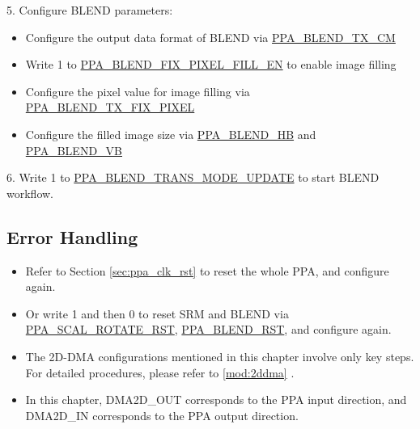 \documentclass[main\_\_EN.tex]{subfiles}
\begin{document}
5. Configure BLEND parameters:
\begin{itemize}
    \item Configure the output data format of BLEND via \hyperref[fielddesc:PPABLENDTXCM]{PPA\_BLEND\_TX\_CM}
    \item Write 1 to \hyperref[fielddesc:PPABLENDFIXPIXELFILLEN]{PPA\_BLEND\_FIX\_PIXEL\_FILL\_EN} to enable image filling
    \item Configure the pixel value for image filling via \hyperref[fielddesc:PPABLENDTXFIXPIXEL]{PPA\_BLEND\_TX\_FIX\_PIXEL}
    \item Configure the filled image size via \hyperref[fielddesc:PPABLENDHB]{PPA\_BLEND\_HB} and \hyperref[fielddesc:PPABLENDVB]{PPA\_BLEND\_VB}
\end{itemize}

6. Write 1 to \hyperref[fielddesc:PPABLENDTRANSMODEUPDATE]{PPA\_BLEND\_TRANS\_MODE\_UPDATE} to start BLEND workflow.

\subsection{Error Handling}
\begin{itemize}
    \item Refer to Section \ref{sec:ppa_clk_rst} to reset the whole PPA, and configure again.
    \item Or write 1 and then 0 to reset SRM and BLEND via \hyperref[fielddesc:PPASCALROTATERST]{PPA\_SCAL\_ROTATE\_RST}, \hyperref[fielddesc:PPABLENDRST]{PPA\_BLEND\_RST}, and configure again.
\end{itemize}

\begin{tiplisting}
\begin{itemize}
    \item The 2D-DMA configurations mentioned in this chapter involve only key steps. For detailed procedures, please refer to \ref{mod:2ddma} \textit{}.
    \item In this chapter, DMA2D\_OUT corresponds to the PPA input direction, and DMA2D\_IN corresponds to the PPA output direction.
\end{itemize}
\end{tiplisting}


\newpage
\hypertarget{ppa-reg-summ}{}
\end{document}
